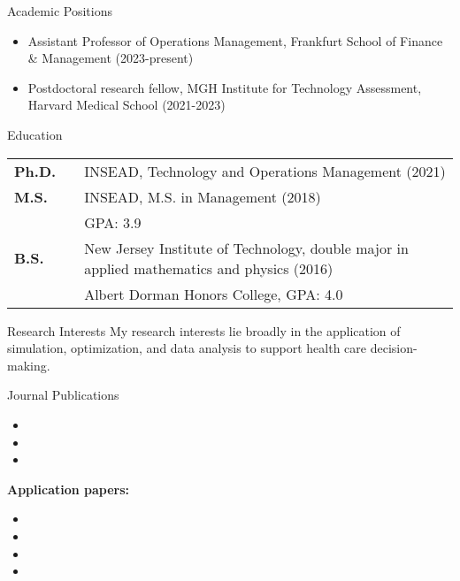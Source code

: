 \documentclass{resume}
\begin{document}


\begin{rSection}{Academic Positions}
  \begin{itemize}
    \item Assistant Professor of Operations Management, Frankfurt School of Finance \& Management (2023-present)
    \item Postdoctoral research fellow, MGH Institute for Technology Assessment, Harvard Medical School (2021-2023)
  \end{itemize}
\end{rSection}


\begin{rSection}{Education}

\begin{tabular}{lll}
\textbf{Ph.D.} & & INSEAD, Technology and Operations Management (2021)\\
\textbf{M.S.} & & INSEAD, M.S. in Management (2018)\\
& & GPA: 3.9\\
\textbf{B.S.} & & New Jersey Institute of Technology, double major in applied mathematics and physics (2016)\\
& & Albert Dorman Honors College, GPA: 4.0
\end{tabular}

\end{rSection}

\begin{rSection}{Research Interests}
My research interests lie broadly in the application of simulation, optimization, and data analysis to support health care decision-making.
\end{rSection}

\begin{rSection}{Journal Publications}
\begin{itemize}
\item {}
\item {}
\item {}
\end{itemize}
\textbf{Application papers:}
\begin{itemize}
  \item {}
  \item {}
  \item {}
  \item {}
\end{itemize}
\end{rSection}
\end{document}
